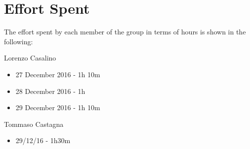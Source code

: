 \section{Effort Spent}

The effort spent by each member of the group in terms of hours is shown in the following:

Lorenzo Casalino

\begin{itemize}
	\item 27 December 2016 - 1h 10m
	\item 28 December 2016 - 1h
	\item 29 December 2016 - 1h 10m
\end{itemize}

Tommaso Castagna

\begin{itemize}
	\item 29/12/16 - 1h30m
\end{itemize}
